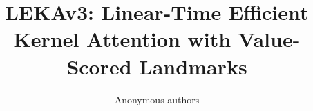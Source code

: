 \title{\textbf{LEKAv3: Linear-Time Efficient Kernel Attention with Value-Scored Landmarks}}

\author{Anonymous authors}
